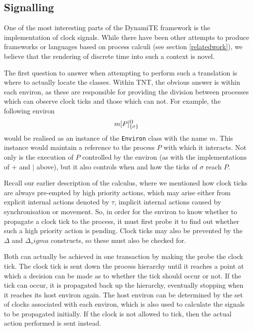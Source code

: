\documentclass{acm_proc_article-sp}
\begin{document}
\subsection{Signalling}
\label{signalling}

One of the most interesting parts of the DynamiTE framework is the
implementation of clock signals.  While there have been other attempts
to produce frameworks or languages based on process calculi (see section
\ref{relatedwork}), we believe that the rendering of discrete time into
such a context is novel.

The first question to answer when attempting to perform such a
translation is where to actually locate the classes.  Within TNT, the
obvious answer is within each environ, as these are responsible for
providing the division between processes which can observe clock ticks
and those which can not.  For example, the following environ
\begin{displaymath}
{m}[ P ]^{\Omega}_{\{\sigma\}}
\end{displaymath}
would be realised as an instance of the \texttt{Environ} class with the
name $m$.  This instance would maintain a reference to the process $P$
with which it interacts.  Not only is the execution of $P$ controlled by
the environ (as with the implementations of $+$ and $\mid$ above), but
it also controls when and how the ticks of $\sigma$ reach $P$.

Recall our earlier description of the calculus, where we mentioned how
clock ticks are always pre-empted by high priority actions, which may
arise either from explicit internal actions denoted by $\tau$, implicit
internal actions caused by synchronisation or movement.  So, in order
for the environ to know whether to propagate a clock tick to the
process, it must first probe it to find out whether such a high priority
action is pending.  Clock ticks may also be prevented by the $\Delta$
and $\Delta_sigma$ constructs, so these must also be checked for.

Both can actually be achieved in one transaction by making the probe the
clock tick.  The clock tick is sent down the process hierarchy until it
reaches a point at which a decision can be made as to whether the tick
should occur or not.  If the tick can occur, it is propagated back up
the hierarchy, eventually stopping when it reaches its host environ
again.  The host environ can be determined by the set of clocks
associated with each environ, which is also used to calculate the
signals to be propagated initially.  If the clock is not allowed to
tick, then the actual action performed is sent instead.
\end{document}
